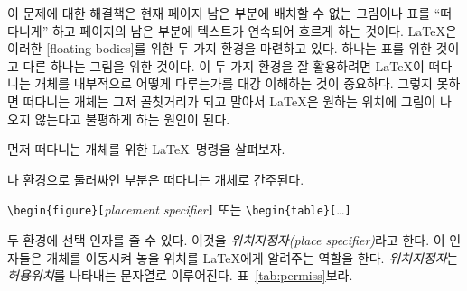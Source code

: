 이 문제에 대한 해결책은 현재 페이지 남은 부분에 배치할 수 없는 그림이나 표를 ``떠다니게''
하고 페이지의 남은 부분에 텍스트가 연속되어 흐르게 하는 것이다.
\LaTeX 은 이러한 [floating bodies]를 위한 두 가지 환경을 마련하고 있다.
하나는 표를 위한 것이고 다른 하나는 그림을 위한 것이다.
이 두 가지 환경을 잘 활용하려면 \LaTeX 이 떠다니는 개체를 내부적으로 어떻게 다루는가를 
대강 이해하는 것이 중요하다.
그렇지 못하면 떠다니는 개체는 그저 골칫거리가 되고 말아서 \LaTeX 은 원하는 위치에 그림이 나오지 
않는다고 불평하게 하는 원인이 된다.

\bigskip
먼저 떠다니는 개체를 위한 \LaTeX\ 명령을 살펴보자.

나  환경으로 둘러싸인 부분은 떠다니는 개체로 간주된다.
\begin{lscommand}
\verb|\begin{figure}[|\emph{placement specifier}\verb|]| 
  또는
\verb|\begin{table}[|\ldots\verb|]|
\end{lscommand}
\noindent  두 환경에 선택 인자를 줄 수 있다. 이것을 \emph{위치지정자(place specifier)}라고 한다.
이 인자들은 개체를 이동시켜 놓을 위치를 \LaTeX 에게 알려주는 역할을 한다.
\emph{위치지정자}는 \emph{허용위치}를 나타내는 문자열로 이루어진다. 표~\ref{tab:permiss}\을 보라.%

